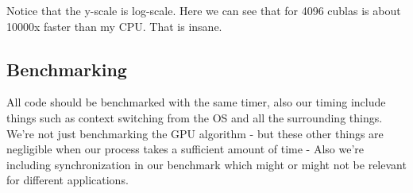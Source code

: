 \documentclass{article}
\begin{document}
Notice that the y-scale is log-scale. Here we can see that for 4096 cublas is about 10000x faster than my CPU. That is insane.

\subsection{Benchmarking}%
\label{sub:benchmarking}

All code should be benchmarked with the same timer, also our timing include things such as context switching from the OS and all the surrounding things. We're not just benchmarking the GPU algorithm - but these other things
are negligible when our process takes a sufficient amount of time - Also we're including synchronization in our benchmark which might or might not be relevant for different applications.
\end{document}
